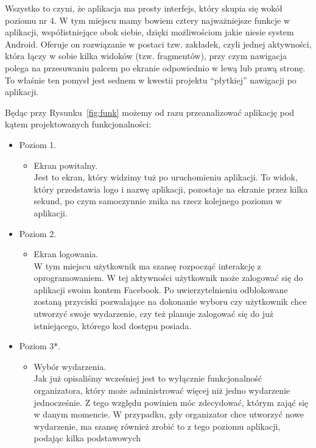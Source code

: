 \documentclass[12pt,titlepage]{article}
\begin{document}
Wszystko to czyni, że aplikacja ma prosty interfejs, który skupia się wokół poziomu nr 4. 
W tym miejscu mamy bowiem cztery najważniejsze funkcje w aplikacji, współistniejące obok siebie, dzięki możliwościom jakie niesie system Android. Oferuje on rozwiązanie w postaci
tzw. zakładek, czyli jednej aktywności, która łączy w sobie kilka widoków (tzw. fragmentów), przy czym nawigacja polega na przesuwaniu palcem po ekranie odpowiednio w lewą lub prawą stronę. 
To właśnie ten pomysł jest sednem w kwestii projektu ``płytkiej'' nawigacji po aplikacji.

Będąc przy Rysunku~\ref{fig:funk} możemy od razu przeanalizować aplikację pod kątem projektowanych funkcjonalności:

\begin{itemize}
 \item Poziom 1.
      \begin{itemize}
        \item Ekran powitalny.
        \\Jest to ekran, który widzimy tuż po uruchomieniu aplikacji. To widok, który przedstawia logo i nazwę aplikacji, pozostaje na ekranie przez kilka sekund, po czym samoczynnie
        znika na rzecz kolejnego poziomu w aplikacji.
       \end{itemize}
 \item Poziom 2.
       \begin{itemize}
        \item Ekran logowania.
        \\ W tym miejscu użytkownik ma szansę rozpocząć interakcję z oprogramowaniem. W tej aktywności użytkownik może zalogować się do aplikacji swoim kontem Facebook.
        Po uwierzytelnieniu odblokowane zostaną przyciski pozwalające na dokonanie wyboru czy użytkownik chce utworzyć swoje wydarzenie, czy też planuje zalogować się
        do już istniejącego, którego kod dostępu posiada.
       \end{itemize}
 \item Poziom 3*.
      \begin{itemize}
       \item Wybór wydarzenia.
       \\ Jak już opisaliśmy wcześniej jest to wyłącznie funkcjonalność organizatora, który może administrować więcej niż jedno wydarzenie jednocześnie. Z tego względu powinien móc
       zdecydować, którym zająć się w danym momencie. W przypadku, gdy organizator chce utworzyć nowe wydarzenie, ma szansę również zrobić to z tego poziomu aplikacji, podając kilka podstawowych

\end{itemize}
\end{itemize}
\end{document}
